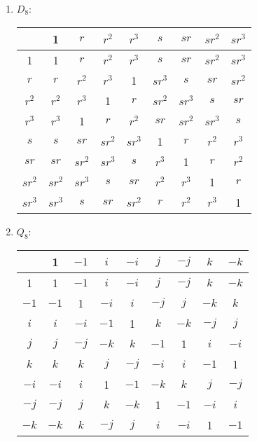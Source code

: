 \documentclass[]{article}
\begin{document}
\begin{enumerate}
\begin{enumerate}
\item $D_8$:
\begin{table}[h!] \centering
\begin{tabular}{c|c|c|c|c|c|c|c|c|}
 & 1 & $r$ & $r^2$ & $r^3$ & $s$ & $sr$ & $sr^2$ & $sr^3$ \\ \hline
1 & 1 & $r$ & $r^2$ & $r^3$ & $s$ & $sr$ & $sr^2$ & $sr^3$ \\ \hline
$r$ & $r$ & $r^2$ & $r^3$ & 1 & $sr^3$ & $s$ & $sr$ & $sr^2$ \\ \hline
$r^2$ & $r^2$ & $r^3$ & 1 & $r$ & $sr^2$ & $sr^3$ & $s$ & $sr$ \\ \hline
$r^3$ & $r^3$ & 1 & $r$ & $r^2$ & $sr$ & $sr^2$ & $sr^3$ & $s$ \\ \hline
$s$ & $s$ & $sr$ & $sr^2$ & $sr^3$ & 1 & $r$ & $r^2$ & $r^3$ \\ \hline
$sr$ & $sr$ & $sr^2$ & $sr^3$ & $s$ & $r^3$ & 1 & $r$ & $r^2$ \\ \hline
$sr^2$ & $sr^2$ & $sr^3$ & $s$ & $sr$ & $r^2$ & $r^3$ & 1 & $r$ \\ \hline
$sr^3$ & $sr^3$ & $s$ & $sr$ & $sr^2$ & $r$ & $r^2$ & $r^3$ & 1 \\ \hline
\end{tabular}
\end{table}


\item $Q_8$:
\begin{table}[h!] \centering
\begin{tabular}{c|c|c|c|c|c|c|c|c|}
 & 1 & $-1$ & $i$ & $-i$ & $j$ & $-j$ & $k$ & $-k$ \\ \hline
1 & 1 & $-1$ & $i$ & $-i$ & $j$ & $-j$ & $k$ & $-k$ \\ \hline
$-1$ & $-1$ & 1 & $-i$ & $i$ & $-j$ & $j$ & $-k$ & $k$ \\ \hline
$i$ & $i$ & $-i$ & $-1$ & 1 & $k$ & $-k$ & $-j$ & $j$ \\ \hline
$j$ & $j$ & $-j$ & $-k$ & $k$ & $-1$ & 1 & $i$ & $-i$ \\ \hline
$k$ & $k$ & $k$ & $j$ & $-j$ & $-i$ & $i$ & $-1$ & 1 \\ \hline
$-i$ & $-i$ & $i$ & 1 & $-1$ & $-k$ & $k$ & $j$ & $-j$ \\ \hline
$-j$ & $-j$ & $j$ & $k$ & $-k$ & 1 & $-1$ & $-i$ & $i$ \\ \hline
$-k$ & $-k$ & $k$ & $-j$ & $j$ & $i$ & $-i$ & 1 & $-1$ \\ \hline
\end{tabular}
\end{table}


\end{enumerate}

\end{enumerate}
\end{document}
